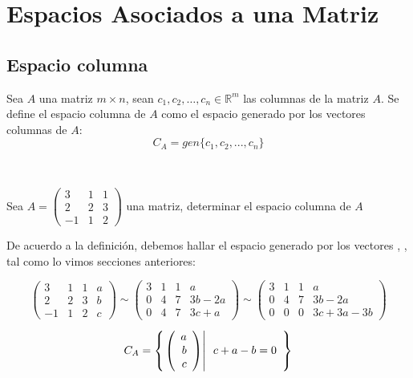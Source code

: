\chapter{Espacios Asociados a una Matriz}

\section{Espacio columna}
\begin{dfn}
Sea $A$ una matriz $m\times n$, sean $c_1,c_2,\ldots, c_n \in \mathbb{R}^m$ las columnas de la matriz $A$. Se define el espacio columna de $A$ como el espacio generado por los vectores columnas de $A$:
~\\
\[C_A=gen\{c_1, c_2, ..., c_n\}\]
\end{dfn}
~\\

\begin{ejemplo}
Sea $A=
\left(
\begin{array}{rrr}
3&1&1\\
2&2&3\\
-1&1&2
\end{array}
\right)$ una matriz, determinar el espacio columna de $A$
 
De acuerdo a la definición, debemos hallar el espacio generado por los vectores , ,  tal como lo vimos secciones anteriores:

\[
\left(
\begin{array}{rrr|r}
3&1&1&a\\
2&2&3&b\\
-1&1&2&c
\end{array}
\right)
\sim
\left(
\begin{array}{rrr|r}
3&1&1&a\\
0&4&7&3b-2a\\
0&4&7&3c+a
\end{array}
\right)
\sim
\left(
\begin{array}{rrr|r}
3&1&1&a\\
0&4&7&3b-2a\\
0&0&0&3c+3a-3b
\end{array}
\right)
\]

\[C_A=\left\{ \left. \left( \begin{array}{r} a\\ b\\ c \end{array} \right) \right| \begin{array}{r}
c+a-b=0\\
\end{array} \right\}
\]

\end{ejemplo}

